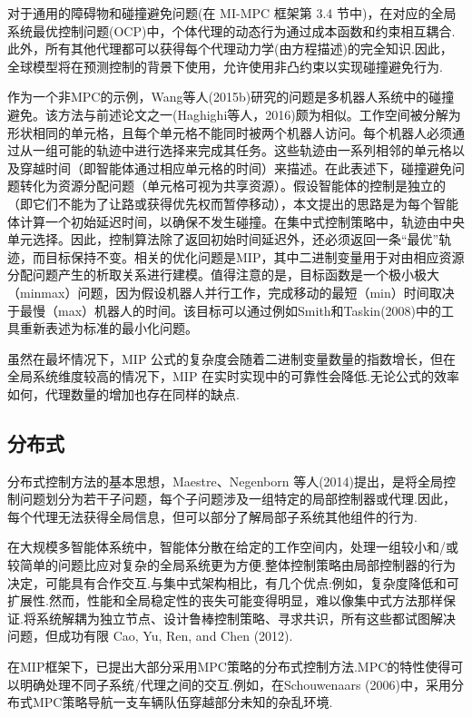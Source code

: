 \documentclass[10pt]{article}
\begin{document}
对于通用的障碍物和碰撞避免问题(在 MI-MPC 框架第 3.4 节中)，在对应的全局系统最优控制问题(OCP)中，个体代理的动态行为通过成本函数和约束相互耦合.此外，所有其他代理都可以获得每个代理动力学(由方程描述)的完全知识.因此，全球模型将在预测控制的背景下使用，允许使用非凸约束以实现碰撞避免行为.

作为一个非MPC的示例，Wang等人(2015b)研究的问题是多机器人系统中的碰撞避免。该方法与前述论文之一(Haghighi等人，2016)颇为相似。工作空间被分解为形状相同的单元格，且每个单元格不能同时被两个机器人访问。每个机器人必须通过从一组可能的轨迹中进行选择来完成其任务。这些轨迹由一系列相邻的单元格以及穿越时间（即智能体通过相应单元格的时间）来描述。在此表述下，碰撞避免问题转化为资源分配问题（单元格可视为共享资源）。假设智能体的控制是独立的（即它们不能为了让路或获得优先权而暂停移动），本文提出的思路是为每个智能体计算一个初始延迟时间，以确保不发生碰撞。在集中式控制策略中，轨迹由中央单元选择。因此，控制算法除了返回初始时间延迟外，还必须返回一条“最优”轨迹，而目标保持不变。相关的优化问题是MIP，其中二进制变量用于对由相应资源分配问题产生的析取关系进行建模。值得注意的是，目标函数是一个极小极大（minmax）问题，因为假设机器人并行工作，完成移动的最短（min）时间取决于最慢（max）机器人的时间。该目标可以通过例如Smith和Taskin(2008)中的工具重新表述为标准的最小化问题。



虽然在最坏情况下，MIP 公式的复杂度会随着二进制变量数量的指数增长，但在全局系统维度较高的情况下，MIP 在实时实现中的可靠性会降低.无论公式的效率如何，代理数量的增加也存在同样的缺点.

\subsection{分布式}

分布式控制方法的基本思想，Maestre、Negenborn 等人(2014)提出，是将全局控制问题划分为若干子问题，每个子问题涉及一组特定的局部控制器或代理.因此，每个代理无法获得全局信息，但可以部分了解局部子系统其他组件的行为.

在大规模多智能体系统中，智能体分散在给定的工作空间内，处理一组较小和/或较简单的问题比应对复杂的全局系统更为方便.整体控制策略由局部控制器的行为决定，可能具有合作交互.与集中式架构相比，有几个优点:例如，复杂度降低和可扩展性.然而，性能和全局稳定性的丧失可能变得明显，难以像集中式方法那样保证.将系统解耦为独立节点、设计鲁棒控制策略、寻求共识，所有这些都试图解决问题，但成功有限 Cao, Yu, Ren, and Chen (2012).

在MIP框架下，已提出大部分采用MPC策略的分布式控制方法.MPC的特性使得可以明确处理不同子系统/代理之间的交互.例如，在Schouwenaars (2006)中，采用分布式MPC策略导航一支车辆队伍穿越部分未知的杂乱环境.
\end{document}
